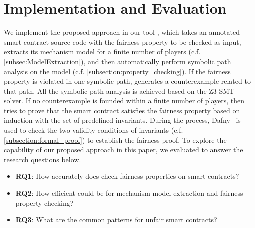 \section{Implementation and Evaluation}\label{Sec_Evaluation}

We implement the proposed approach in our tool \faircon, which takes an annotated smart contract
source code with the fairness property to be checked as input, extracts its mechanism model for a
finite number of players (c.f. \cref{subsec:ModelExtraction}), and then automatically perform
symbolic path analysis on the model (c.f. \cref{subsection:property_checking}). If the
fairness property is violated in one symbolic path, \faircon generates a counterexample related to
that path. All the symbolic path analysis is achieved based on the Z3 SMT solver. If no
counterexample is founded within a finite number of players, \faircon then tries to prove that the
smart contract satisfies the fairness property based on induction with the set of predefined
invariants. During the process, Dafny~\cite{dafny} is used to check the two validity conditions of
invariants (c.f. \cref{subsection:formal_proof}) to establish the fairness proof. To explore the
capability of our proposed approach in this paper, we evaluated \faircon to answer the research
questions below.

\begin{itemize}[leftmargin=*]
	\item \textbf{RQ1}: How accurately does \faircon check fairness properties on smart contracts?
	\item \textbf{RQ2}: How efficient could \faircon be for mechanism model extraction and fairness
	property checking?
	\item \textbf{RQ3}: What are the common patterns for unfair smart contracts?
\end{itemize}

